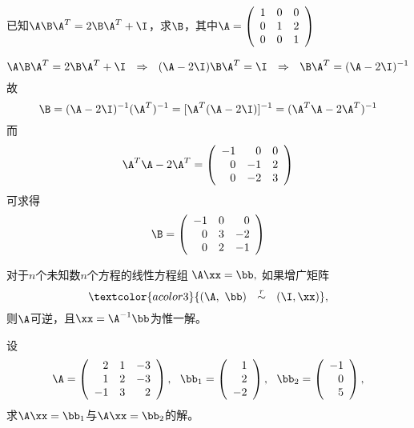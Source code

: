 \begin{frame}\ft{\secname}
\begin{li}
  已知$\A\B\A^T=2\B\A^T+\I$，求$\B$，其中$
  \A = \left(
    \begin{array}{ccc}
      1&0&0\\
      0&1&2\\
      0&0&1
    \end{array}
  \right)
  $
\end{li}
\end{frame}


\begin{frame}\ft{\secname}
\begin{jie}
$$
\A\B\A^T=2\B\A^T+\I ~~ \Rightarrow ~~ (\A-2\I)\B\A^T=\I 
~~ \Rightarrow ~~ \B\A^T = (\A-2\I)^{-1}
$$
\pause
故
$$
\B = (\A-2\I)^{-1} (\A^T)^{-1}  = [\A^T(\A-2\I)]^{-1} 
=(\A^T\A-2\A^T)^{-1}
$$\pause
而
$$
\A^T\A-2\A^T = \left(
  \begin{array}{rrr}
    -1&0&0\\
    0&-1&2\\
    0&-2&3
  \end{array}
\right)
$$ \pause
可求得
$$
\B = \left(
  \begin{array}{rrr}
    -1&0&0\\
    0&3&-2\\
    0&2&-1
  \end{array}
\right)
$$
\end{jie}
\end{frame}


\begin{frame}\ft{\secname}

\begin{tuilun}
  对于$n$个未知数$n$个方程的线性方程组
  $
  \A\xx=\bb,
  $
  如果增广矩阵
  $$
  \textcolor{acolor3}{(\A,~\bb)~~\overset{r}{\sim}~~(\I,\xx)},
  $$
  则$\A$可逆，且$\xx=\A^{-1}\bb$为惟一解。  
\end{tuilun}
\end{frame}


\begin{frame}\ft{\secname}
\begin{li}
  设
  $$
  \A = \left(
    \begin{array}{rrr}
      2&1&-3\\
      1&2&-3\\
      -1&3&2
    \end{array}
  \right),
  ~~
  \bb_1=\left(
    \begin{array}{r}
      1\\
      2\\
      -2
    \end{array}
  \right),
  ~~
  \bb_2=\left(
    \begin{array}{r}
      -1\\
      0\\
      5
    \end{array}
  \right),
  $$
  求$\A\xx=\bb_1$与$\A\xx=\bb_2$的解。
\end{li}
\end{frame}


